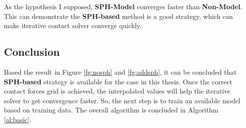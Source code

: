     As the hypothesis I supposed, \textbf{SPH-Model} converges faster than \textbf{Non-Model}. This can demonstrate the \textbf{SPH-based} method is a good strategy, which can make iterative contact solver converge quickly.

\subsection{Conclusion}
    Based the result in Figure \ref{fg:nosph} and \ref{fg:addsph}, it can be concluded that \textbf{SPH-based} strategy is available for the case in this thesis. Once the correct contact forces grid is achieved, the interpolated values will help the iterative solver to get convergence faster. So, the next step is to train an available model based on training data. The overall algorithm is concluded in Algorithm \ref{al:basic}.